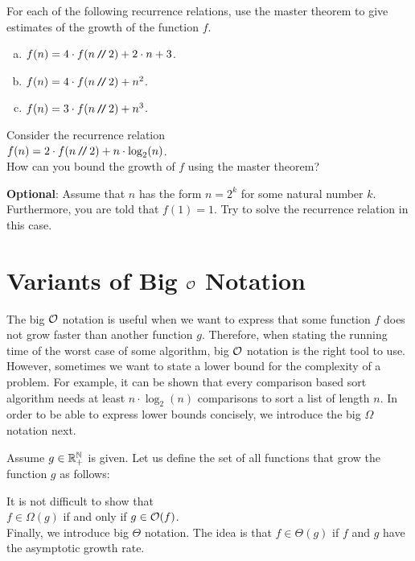 \exercise
For each of the following recurrence relations, use the master theorem to give estimates of the
growth of the function $f$. 
\begin{enumerate}[(a)]
\item $f(n) = 4 \cdot f(n \mbox{\,\texttt{/}$\!$\texttt{/}\,} 2) + 2 \cdot n + 3$.
\item $f(n) = 4 \cdot f(n \mbox{\,\texttt{/}$\!$\texttt{/}\,} 2) + n^2$.
\item $f(n) = 3 \cdot f(n \mbox{\,\texttt{/}$\!$\texttt{/}\,} 2) + n^3$.  \eox
\end{enumerate}
\pagebreak

\exercise
Consider the recurrence relation
\\[0.2cm]
\hspace*{1.3cm}
$f(n) = 2 \cdot f(n \mbox{\,\texttt{/}$\!$\texttt{/}\,} 2) + n \cdot \log_2(n)$.
\\[0.2cm] 
How can you bound the growth of $f$ using the master theorem? 
\vspace*{0.1cm}

\noindent
\textbf{Optional}: Assume that $n$ has the form $n = 2^k$ for some natural number $k$.
Furthermore, you are told that $f(1) = 1$.  Try to solve the recurrence relation in this case.
\eox

\section{Variants of Big $\mathcal{O}$ Notation}
The big $\mathcal{O}$ notation is useful when we want to express that some function $f$ does not grow faster
than another function $g$.  Therefore, when stating the running time of the worst case of some algorithm,
big $\mathcal{O}$ notation is the right tool to use.  However, sometimes we want to state a lower bound for
the complexity of a problem.  For example, it can be shown that every comparison based sort algorithm needs at least
$n \cdot \log_2(n)$ comparisons to sort a list of length $n$.  In order to be able to express lower
bounds concisely, we introduce the big $\Omega$ notation next.

\begin{Definition}[$\Omega(g)$] 
  Assume $g \in {\mathbb R}_+^{{\mathbb N}}$ is given.   Let us define the set of all functions that grow 
   the function $g$ as follows:
  \\[0.2cm]
  \hspace*{0.5cm} 
  \colorbox{red}{}
  \eox
\end{Definition}
It is not difficult to show that
\\[0.2cm]
\hspace*{1.3cm}
 $f \in \Omega(g)$ \quad if and only if \quad $g \in \mathcal{O}(f)$.
\\[0.2cm]
Finally, we introduce big $\Theta$ notation.  The idea is that $f \in \Theta(g)$ if 
$f$ and $g$ have the  asymptotic growth rate. 

